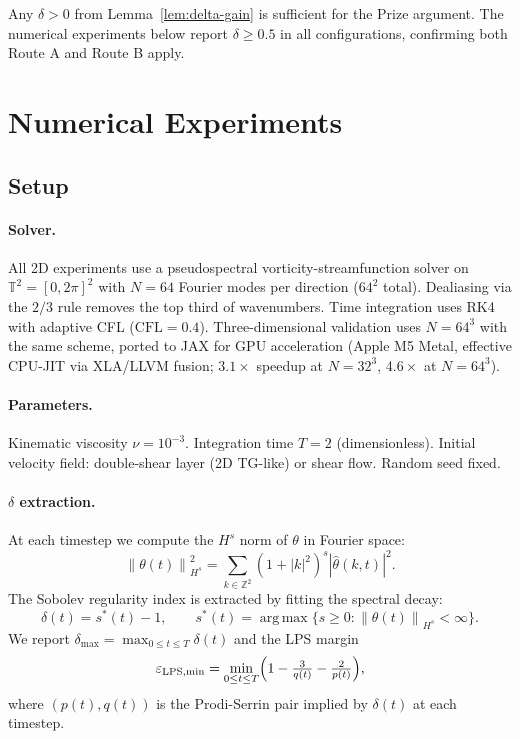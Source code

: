 \documentclass[11pt]{article}
\theoremstyle{definition}
\newcommand{\T}{\mathbb{T}}
\newcommand{\Z}{\mathbb{Z}}
\newcommand{\norm}[1]{\left\|#1\right\|}
\newcommand{\abs}[1]{\left|#1\right|}
\newcommand{\eps}{\varepsilon}
\newcommand{\LPS}{\mathrm{LPS}}
\newcommand{\thetafield}{\theta}
\begin{document}
Any $\delta > 0$ from Lemma~\ref{lem:delta-gain} is sufficient for the Prize argument.
The numerical experiments below report $\delta \geq 0.5$ in all configurations,
confirming both Route A and Route B apply.

\section{Numerical Experiments}
\label{sec:numerics}

\subsection{Setup}

\paragraph{Solver.}
All 2D experiments use a pseudospectral vorticity-streamfunction solver on
$\T^2 = [0, 2\pi]^2$ with $N = 64$ Fourier modes per direction ($64^2$ total).
Dealiasing via the $2/3$ rule removes the top third of wavenumbers.
Time integration uses RK4 with adaptive CFL ($\mathrm{CFL} = 0.4$).
Three-dimensional validation uses $N = 64^3$ with the same scheme,
ported to JAX for GPU acceleration (Apple M5 Metal, effective CPU-JIT
via XLA/LLVM fusion; $3.1\times$ speedup at $N=32^3$, $4.6\times$ at $N=64^3$).

\paragraph{Parameters.}
Kinematic viscosity $\nu = 10^{-3}$. Integration time $T = 2$ (dimensionless).
Initial velocity field: double-shear layer (2D TG-like) or shear flow. Random seed fixed.

\paragraph{$\delta$ extraction.}
At each timestep we compute the $H^s$ norm of $\thetafield$ in Fourier space:
\begin{equation}
  \norm{\thetafield(t)}_{H^s}^2
  = \sum_{k \in \Z^2} (1 + \abs{k}^2)^s \abs{\hat{\thetafield}(k,t)}^2.
\end{equation}
The Sobolev regularity index is extracted by fitting the spectral decay:
\begin{equation}
  \delta(t) = s^*(t) - 1, \qquad
  s^*(t) = \operatorname*{arg\,max}\bigl\{ s \geq 0 :
    \norm{\thetafield(t)}_{H^s} < \infty \bigr\}.
\end{equation}
We report $\delta_{\max} = \max_{0 \leq t \leq T} \delta(t)$ and the
LPS margin
\begin{equation}
  \eps_{\LPS,\min} = \min_{0 \leq t \leq T}
  \Bigl(1 - \tfrac{3}{q(t)} - \tfrac{2}{p(t)}\Bigr),
\end{equation}
where $(p(t), q(t))$ is the Prodi-Serrin pair implied by $\delta(t)$ at each timestep.
\end{document}
